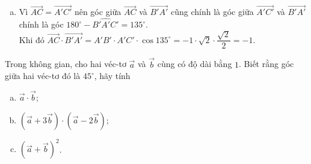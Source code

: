 \begin{bt}
{{}	
	\begin{enumerate}[c)]	
	\item  Vì $\overrightarrow{A C}=\overrightarrow{A'C'}$ nên góc giữa $\overrightarrow{A C}$ và $\overrightarrow{B' A'}$ cũng chính là góc giữa $\overrightarrow{A'C'}$ và $\overrightarrow{B' A'}$ chính là góc $180^\circ -\widehat{B'A'C'}=135^\circ$.
	\\
	Khi đó $\overrightarrow{A C}\cdot \overrightarrow{B' A'}=A'B'\cdot A'C'\cdot \cos135^\circ=-1\cdot \sqrt{2}\cdot\dfrac{\sqrt{2}}{2}=-1$.
\end{enumerate}	
	}
\end{bt}

\begin{bt}%

 Trong không gian, cho hai véc-tơ $\overrightarrow{a}$ và $\overrightarrow{b}$ cùng có độ dài bằng $1$. Biết rằng góc giữa hai véc-tơ đó là $45^{\circ}$, hãy tính
	\begin{enumerate}[a)]	
		\item  $\overrightarrow{a}\cdot \overrightarrow{b}$;
		\item  $\left( \overrightarrow{a}+3 \overrightarrow{b}\right)  \cdot\left( \overrightarrow{a}-2 \overrightarrow{b}\right) $;
		\item  $\left( \overrightarrow{a}+ \overrightarrow{b}\right)^2 $.
	\end{enumerate}
\end{bt}

